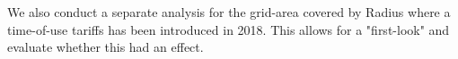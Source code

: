 We also conduct a separate analysis for the grid-area covered by Radius where a time-of-use tariffs has been introduced in 2018. This allows for a "first-look"  and evaluate whether this had an effect. 

\begin{comment}
Kopi af abstract: 
  Our results are estimated using the Random Effects Instrument Variable-estimator (REIV). Electricity prices are estimated using wind-power production to overcome concerns of endogeneity. Our estimated price elasticities of -0.045 and -0.027 (for wholesale vis-a-vis retail consumers) are small in size. Similarly we find a relatively small effect from the introduction of a time-of-use tariff. Overall results suggest a limited scope for decentralized, price-based tools to alter electricity demand, but these are not conclusive and further research should be devoted to this. 
  
\end{comment}
\begin{comment}
Gammel konklusion: 
We estimate statistically significant own-price elasticities of demand for wholesale consumers and a statistically significant effect of the time-of-use (TOU) tariff in the grid company Radius. However, the economic magnitude of the quite modest is debatable.
\medskip \\
Literature in this field is quite large but there is still substantial room for improvement, especially within the field of estimating hour-by-hour responses at the micro-level to capture heterogeneity in this aspect.
\end{comment}